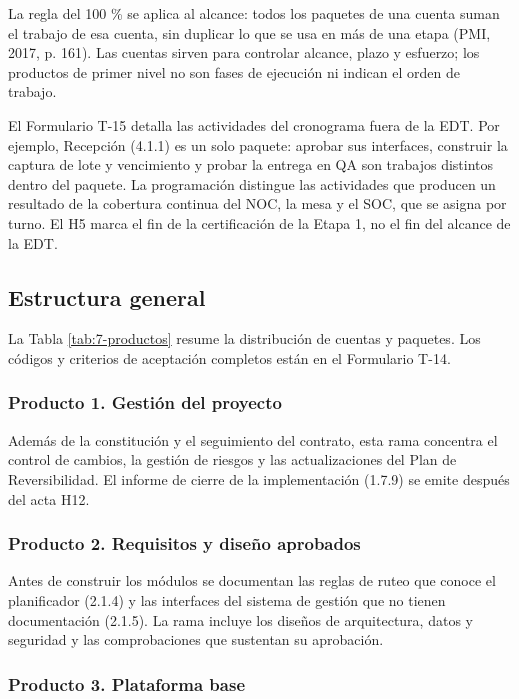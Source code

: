 La regla del 100 \% se aplica al alcance: todos los paquetes de una cuenta suman el trabajo de esa cuenta, sin duplicar lo que se usa en más de una etapa (PMI, 2017, p. 161). Las cuentas sirven para controlar alcance, plazo y esfuerzo; los productos de primer nivel no son fases de ejecución ni indican el orden de trabajo.

El Formulario T-15 detalla las actividades del cronograma fuera de la EDT. Por ejemplo, Recepción (4.1.1) es un solo paquete: aprobar sus interfaces, construir la captura de lote y vencimiento y probar la entrega en QA son trabajos distintos dentro del paquete. La programación distingue las actividades que producen un resultado de la cobertura continua del NOC, la mesa y el SOC, que se asigna por turno. El H5 marca el fin de la certificación de la Etapa 1, no el fin del alcance de la EDT.

\subsection{Estructura general}

La Tabla \ref{tab:7-productos} resume la distribución de cuentas y paquetes. Los códigos y criterios de aceptación completos están en el Formulario T-14.


\subsubsection{Producto 1. Gestión del proyecto}

Además de la constitución y el seguimiento del contrato, esta rama concentra el control de cambios, la gestión de riesgos y las actualizaciones del Plan de Reversibilidad. El informe de cierre de la implementación (1.7.9) se emite después del acta H12.

\subsubsection{Producto 2. Requisitos y diseño aprobados}

Antes de construir los módulos se documentan las reglas de ruteo que conoce el planificador (2.1.4) y las interfaces del sistema de gestión que no tienen documentación (2.1.5). La rama incluye los diseños de arquitectura, datos y seguridad y las comprobaciones que sustentan su aprobación.

\subsubsection{Producto 3. Plataforma base}

